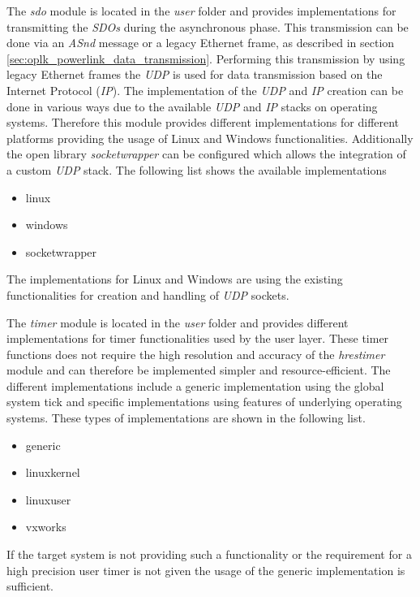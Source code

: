 \begin{description}[leftmargin=1cm]
    \item[sdo] The \emph{sdo} module is located in the \emph{user} folder and provides implementations for transmitting the \emph{SDOs} during the asynchronous phase.
    This transmission can be done via an \emph{ASnd} message or a legacy Ethernet frame, as described in section \ref{sec:oplk_powerlink_data_transmission}.
    Performing this transmission by using legacy Ethernet frames the \emph{UDP} is used for data transmission based on the Internet Protocol (\emph{IP}).
    The implementation of the \emph{UDP} and \emph{IP} creation can be done in various ways due to the available \emph{UDP} and \emph{IP} stacks on operating systems.
    Therefore this module provides different implementations for different platforms providing the usage of Linux and Windows functionalities.
    Additionally the open library \emph{socketwrapper} can be configured which allows the integration of a custom \emph{UDP} stack.
    The following list shows the available implementations
    \begin{multicols}{3}
        \begin{itemize}
            \item linux
            \item windows
            \item socketwrapper
        \end{itemize}
    \end{multicols}
    The implementations for Linux and Windows are using the existing functionalities for creation and handling of \emph{UDP} sockets.\\
    
    
    \item[timer] The \emph{timer} module is located in the \emph{user} folder and provides different implementations for timer functionalities used by the user layer.
    These timer functions does not require the high resolution and accuracy of the \emph{hrestimer} module and can therefore be implemented simpler and resource-efficient.
    The different implementations include a generic implementation using the global system tick and specific implementations using features of underlying operating systems.
    These types of implementations are shown in the following list.
    \begin{multicols}{3}
        \begin{itemize}
            \item generic
            \item linuxkernel
            \item linuxuser
            \item vxworks
        \end{itemize}
    \end{multicols}
    If the target system is not providing such a functionality or the requirement for a high precision user timer is not given the usage of the generic implementation is sufficient.\\
    

\end{description}
